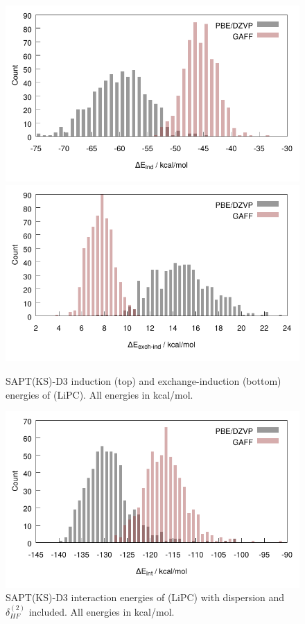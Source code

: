 \begin{figure}
 \begin{center}
 \includegraphics[width=0.9\linewidth]{images/ecpc/lipc_ind.pdf} \\
 \includegraphics[width=0.9\linewidth]{images/ecpc/lipc_exch-ind.pdf}
 \end{center} 
 \caption[SAPT(KS)-D3 induction and exchange-induction energies of (LiPC)\sur{+}]{\label{fig:pcsapt2}SAPT(KS)-D3 induction (top) and exchange-induction
 (bottom) energies of (LiPC)\sur{+}. All energies in kcal/mol.}
\end{figure}

\begin{figure}
 \begin{center}
 \includegraphics[width=0.9\linewidth]{images/ecpc/lipc_int.pdf}
 \end{center} 
 \caption[SAPT(KS)-D3 interaction energies of (LiPC)\sur{+}]{\label{fig:pcsaptint}SAPT(KS)-D3 interaction energies of (LiPC)\sur{+} with dispersion and
 $\delta_{HF}^{(2)}$ included. All energies in kcal/mol.}
\end{figure}
